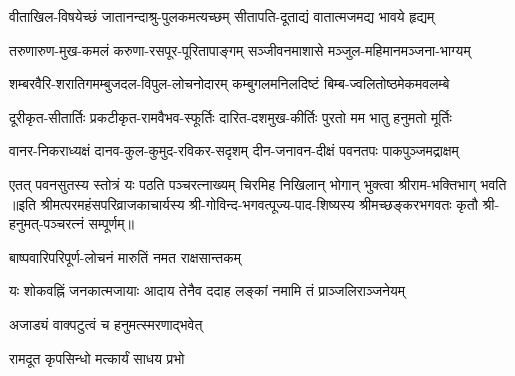 
\twolineshloka
{वीताखिल-विषयेच्छं जातानन्दाश्रु-पुलकमत्यच्छम्}
{सीतापति-दूताद्यं वातात्मजमद्य भावये हृद्यम्}

\twolineshloka
{तरुणारुण-मुख-कमलं करुणा-रसपूर-पूरितापाङ्गम्}
{सञ्जीवनमाशासे मञ्जुल-महिमानमञ्जना-भाग्यम्}

\twolineshloka
{शम्बरवैरि-शरातिगमम्बुजदल-विपुल-लोचनोदारम्}
{कम्बुगलमनिलदिष्टं बिम्ब-ज्वलितोष्ठमेकमवलम्बे}

\twolineshloka
{दूरीकृत-सीतार्तिः प्रकटीकृत-रामवैभव-स्फूर्तिः}
{दारित-दशमुख-कीर्तिः पुरतो मम भातु हनुमतो मूर्तिः}

\twolineshloka
{वानर-निकराध्यक्षं दानव-कुल-कुमुद-रविकर-सदृशम्}
{दीन-जनावन-दीक्षं पवनतपः पाकपुञ्जमद्राक्षम्}

\twolineshloka
{एतत् पवनसुतस्य स्तोत्रं यः पठति पञ्चरत्नाख्यम्}
{चिरमिह निखिलान् भोगान् भुक्त्वा श्रीराम-भक्तिभाग् भवति}
॥इति श्रीमत्परमहंसपरिव्राजकाचार्यस्य श्री-गोविन्द-भगवत्पूज्य-पाद-शिष्यस्य
श्रीमच्छङ्करभगवतः कृतौ श्री-हनुमत्-पञ्चरत्नं सम्पूर्णम्॥

{बाष्पवारिपरिपूर्ण-लोचनं मारुतिं नमत राक्षसान्तकम्}

{यः शोकवह्निं जनकात्मजायाः}
{आदाय तेनैव ददाह लङ्कां}
{नमामि तं प्राञ्जलिराञ्जनेयम्}

{अजाड्यं वाक्पटुत्वं च हनुमत्स्मरणाद्भवेत्}

{रामदूत कृपसिन्धो मत्कार्यं साधय प्रभो}

